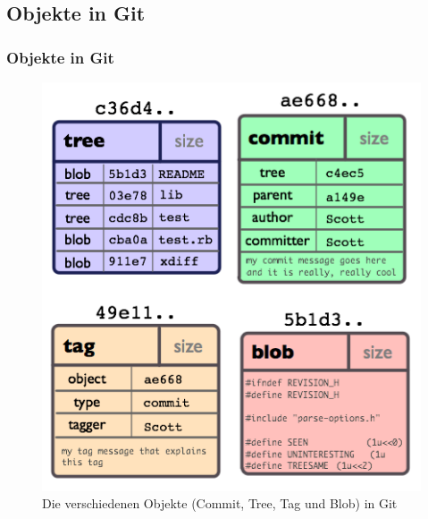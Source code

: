 \documentclass{beamer}
\begin{document}
\subsection{Objekte in Git}

\begin{frame}\frametitle{Objekte in Git}

\begin{figure}
\includegraphics[scale=0.4]{Bilder/Objects} 
{\tiny \caption{Die verschiedenen Objekte (Commit, Tree, Tag und Blob) in Git}}
\end{figure}
\end{frame}
\end{document}
